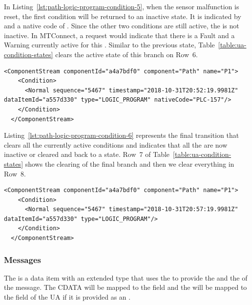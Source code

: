 In Listing~\ref{lst:path-logic-program-condition-5}, when the sensor malfunction is reset, the first condition will be returned to an inactive state. It is indicated by  and a native code of . Since the other two conditions are still active, the  is not inactive. In MTConnect, a  request would indicate that there is a Fault and a Warning currently active for this . Similar to the previous state, Table~\ref{table:ua-condition-states} clears the active state of this branch on Row~6.

\begin{lstlisting}[firstnumber=last,escapechar=|,%
    caption={Path Logic Program Clear Warning PLC-157},label={lst:path-logic-program-condition-5}]
  <ComponentStream componentId="a4a7bdf0" component="Path" name="P1">
    <Condition>
      <Normal sequence="5467" timestamp="2018-10-31T20:52:19.9981Z" dataItemId="a557d330" type="LOGIC_PROGRAM" nativeCode="PLC-157"/>
    </Condition>
  </ComponentStream>
\end{lstlisting}

Listing~\ref{lst:path-logic-program-condition-6} represents the final  transition that clears all the currently active conditions and indicates that all the  are now inactive or cleared and back to a  state. Row~7 of Table~\ref{table:ua-condition-states} shows the clearing of the final branch and then we clear everything in Row~8.

\begin{lstlisting}[firstnumber=last,escapechar=|,%
    caption={Path Logic Program Back to Normal, All Clear},label={lst:path-logic-program-condition-6}]
  <ComponentStream componentId="a4a7bdf0" component="Path" name="P1">
    <Condition>
      <Normal sequence="5467" timestamp="2018-10-31T20:57:19.9981Z" dataItemId="a557d330" type="LOGIC_PROGRAM"/>
    </Condition>
  </ComponentStream>
\end{lstlisting}

\subsubsection{Messages}

The  is a data item with an extended type that uses the  to provide the  and the  of the message. The \gls{CDATA} will be mapped to the  field and the  will be mapped to the field of the UA  if it is provided as an .

